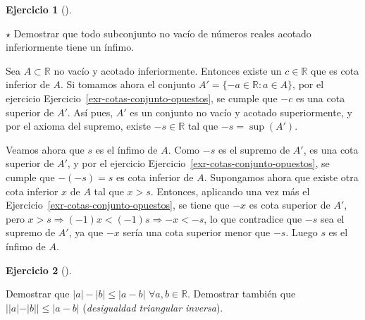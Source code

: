 \documentclass[
  spanish,
  a4paper,
]{scrreport}
\theoremstyle{definition}
\newtheorem{exercise}{Ejercicio}[chapter]
\theoremstyle{remark}
\begin{document}
\begin{exercise}[]\protect\hypertarget{exr-propiedad-infimo}{}\label{exr-propiedad-infimo}

\(\star\) Demostrar que todo subconjunto no vacío de números reales
acotado inferiormente tiene un ínfimo.

\end{exercise}

\begin{tcolorbox}[enhanced jigsaw, arc=.35mm, bottomrule=.15mm, bottomtitle=1mm, breakable, colback=white, colbacktitle=quarto-callout-tip-color!10!white, colframe=quarto-callout-tip-color-frame, coltitle=black, left=2mm, leftrule=.75mm, opacityback=0, opacitybacktitle=0.6, rightrule=.15mm, title=\textcolor{quarto-callout-tip-color}{\faLightbulb}\hspace{0.5em}{Solución}, titlerule=0mm, toprule=.15mm, toptitle=1mm]

Sea \(A\subset\mathbb{R}\) no vacío y acotado inferiormente. Entonces
existe un \(c\in\mathbb{R}\) que es cota inferior de \(A\). Si tomamos
ahora el conjunto \(A'=\{-a\in\mathbb{R}: a\in A\}\), por el ejercicio
Ejercicio~\ref{exr-cotas-conjunto-opuestos}, se cumple que \(-c\) es una
cota superior de \(A'\). Así pues, \(A'\) es un conjunto no vacío y
acotado superiormente, y por el axioma del supremo, existe
\(-s\in\mathbb{R}\) tal que \(-s=\sup(A')\).

Veamos ahora que \(s\) es el ínfimo de \(A\). Como \(-s\) es el supremo
de \(A'\), es una cota superior de \(A'\), y por el ejercicio
Ejercicio~\ref{exr-cotas-conjunto-opuestos}, se cumple que \(-(-s)=s\)
es cota inferior de \(A\). Supongamos ahora que existe otra cota
inferior \(x\) de \(A\) tal que \(x>s\). Entonces, aplicando una vez más
el Ejercicio~\ref{exr-cotas-conjunto-opuestos}, se tiene que \(-x\) es
cota superior de \(A'\), pero
\(x>s\Rightarrow (-1)x<(-1)s \Rightarrow -x<-s\), lo que contradice que
\(-s\) sea el supremo de \(A'\), ya que \(-x\) sería una cota superior
menor que \(-s\). Luego \(s\) es el ínfimo de \(A\).

\end{tcolorbox}

\begin{exercise}[]\protect\hypertarget{exr-propiedad-valor-absoluto}{}\label{exr-propiedad-valor-absoluto}

Demostrar que \(|a|-|b|\leq |a-b|\) \(\forall a,b\in\mathbb{R}\).
Demostrar también que \(||a|-|b||\leq |a-b|\) (\emph{desigualdad
triangular inversa}).

\end{exercise}
\end{document}
